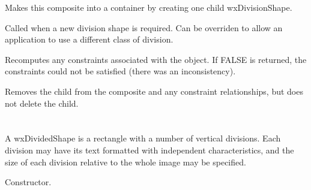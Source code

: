 \label{wxcompositeshapemakecontainer}


Makes this composite into a container by creating one child wxDivisionShape.



Called when a new division shape is required. Can be overriden to allow an application
to use a different class of division.

\label{wxcompositeshaperecompute}


Recomputes any constraints associated with the object. If FALSE is returned,
the constraints could not be satisfied (there was an inconsistency).



Removes the child from the composite and any constraint relationships, but does not
delete the child.

\section{}\label{wxdividedshape}

A wxDividedShape is a rectangle with a number of vertical divisions. Each
division may have its text formatted with independent characteristics, and
the size of each division relative to the whole image may be specified.








Constructor.


